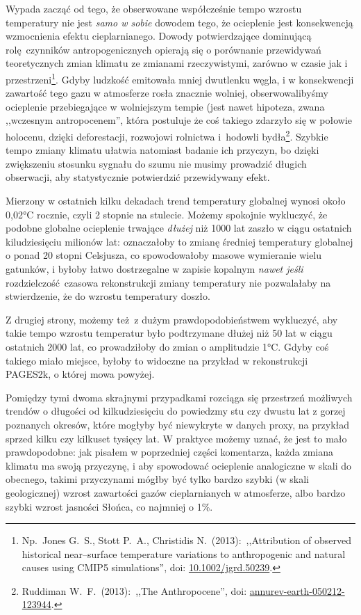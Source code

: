 \documentclass[12pt]{article}
\newcommand{\doi}[1]{doi: \href{htts://doi.org/#1}{#1}}
\begin{document}
Wypada zacząć od tego, że obserwowane współcześnie tempo wzrostu temperatury nie jest \emph{samo w sobie} dowodem tego, że ocieplenie jest konsekwencją wzmocnienia efektu cieplarnianego. Dowody potwierdzające dominującą rolę czynników antropogenicznych opierają się o porównanie przewidywań teoretycznych zmian klimatu ze zmianami rzeczywistymi, zarówno w czasie jak i przestrzeni\footnote{Np.~Jones G.~S., Stott P.~A., Christidis N.~(2013):~,,Attribution of observed historical near--surface temperature variations to anthropogenic and natural causes using CMIP5 simulations'', \doi{10.1002/jgrd.50239}.}. Gdyby ludzkość emitowała mniej dwutlenku węgla, i w konsekwencji zawartość tego gazu w atmosferze rosła znacznie wolniej, obserwowalibyśmy ocieplenie przebiegające w wolniejszym tempie (jest nawet hipoteza, zwana ,,wczesnym antropocenem'', która postuluje że coś takiego zdarzyło się w połowie holocenu, dzięki deforestacji, rozwojowi rolnictwa i~hodowli bydła\footnote{Ruddiman W.~F.~(2013):~,,The Anthropocene'', \doi{annurev-earth-050212-123944}.}. Szybkie tempo zmiany klimatu ułatwia natomiast badanie ich przyczyn, bo dzięki zwiększeniu stosunku sygnału do szumu nie musimy prowadzić długich obserwacji, aby statystycznie potwierdzić przewidywany efekt.

Mierzony w ostatnich kilku dekadach trend temperatury globalnej wynosi około 0{,}02\si{\celsius} rocznie, czyli 2 stopnie na stulecie. Możemy spokojnie wykluczyć, że podobne globalne ocieplenie trwające \emph{dłużej} niż 1000 lat zaszło w ciągu ostatnich kiludziesięciu milionów lat: oznaczałoby to zmianę średniej temperatury globalnej o ponad 20 stopni Celsjusza, co spowodowałoby masowe wymieranie wielu gatunków, i byłoby łatwo dostrzegalne w zapisie kopalnym \emph{nawet jeśli} rozdzielczość czasowa rekonstrukcji zmiany temperatury nie pozwalałaby na stwierdzenie, że do wzrostu temperatury doszło.

Z drugiej strony, możemy też z dużym prawdopodobieństwem wykluczyć, aby takie tempo wzrostu temperatur było podtrzymane dłużej niż 50 lat w ciągu ostatnich 2000 lat, co prowadziłoby do zmian o amplitudzie 1\si{\celsius}. Gdyby coś takiego miało miejsce, byłoby to widoczne na przykład w rekonstrukcji PAGES2k, o której mowa powyżej.

Pomiędzy tymi dwoma skrajnymi przypadkami rozciąga się przestrzeń możliwych trendów o długości od kilkudziesięciu do powiedzmy stu czy dwustu lat z gorzej poznanych okresów, które mogłyby być niewykryte w danych proxy, na przykład sprzed kilku czy kilkuset tysięcy lat. W praktyce możemy uznać, że jest to mało prawdopodobne: jak pisałem w poprzedniej części komentarza, każda zmiana klimatu ma swoją przyczynę, i aby spowodować ocieplenie analogiczne w skali do obecnego, takimi przyczynami mógłby być tylko bardzo szybki (w skali geologicznej) wzrost zawartości gazów cieplarnianych w atmosferze, albo bardzo szybki wzrost jasności Słońca, co najmniej o 1\%.
\end{document}
